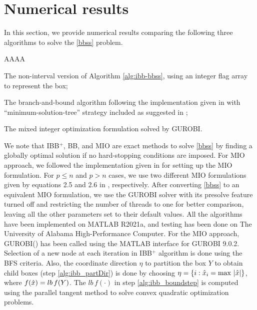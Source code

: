 \documentclass[10pt, letterpaper]{article}
\begin{document}
\section{Numerical results}
\label{sec:test_results}
In this section, we provide numerical results comparing the following three algorithms to solve the \eqref{bbss} problem. 
\begin{labeling}{AAAA}  %
    \item[\textbf{IBB$^{+}$}] The non-interval version of Algorithm \ref{alg:ibb-bbss}, using an integer flag array to represent the box;
    \item[\textbf{BB}] The branch-and-bound algorithm following the implementation given in \cite{somol2004fast} with ``minimum-solution-tree'' strategy included as suggested in \cite{yu1993more};
    \item[\textbf{MIO}] The mixed integer optimization formulation solved by GUROBI.
\end{labeling} 
We note that IBB$^{+}$, BB, and MIO are exact methods to solve \eqref{bbss} by finding a globally optimal solution if no hard-stopping conditions are imposed. For MIO approach, we followed the implementation given in \cite{bertsimasEtal:2015} for setting up the MIO formulation. For $p\leq n$ and $p>n$ cases, we use two different MIO formulations given by equations 2.5 and 2.6 in \cite{bertsimasEtal:2015}, respectively.  After converting \eqref{bbss} to an equivalent MIO formulation, we use the \textsc{GUROBI} solver with its presolve feature turned off and restricting the number of threads to one for better comparison, leaving all the other parameters set to their default values. 
All the algorithms have been implemented on \textsc{MATLAB} R2021a, and testing has been done on The University of Alabama High-Performance Computer. For the MIO approach, \textsc{GUROBI}(\cite{gurobi}) has been called using the \textsc{MATLAB} interface for \textsc{GUROBI} 9.0.2. Selection of a new node at each iteration in IBB$^{+}$ algorithm is done using the BFS criteria. 
Also, the coordinate direction $\eta$ to partition the box $Y$ to obtain child boxes (step \ref{alg:ibb_partDir}) is done by choosing $\eta=\{i: \Hat{x}_{i}=\max\,|\Hat{x}|\}$, where $f(\Hat{x})=lb\,f(Y)$. The $lb\, f(\cdot)$ in step \ref{alg:ibb_boundstep} is computed using the parallel tangent method to solve convex quadratic optimization problems.
\end{document}
